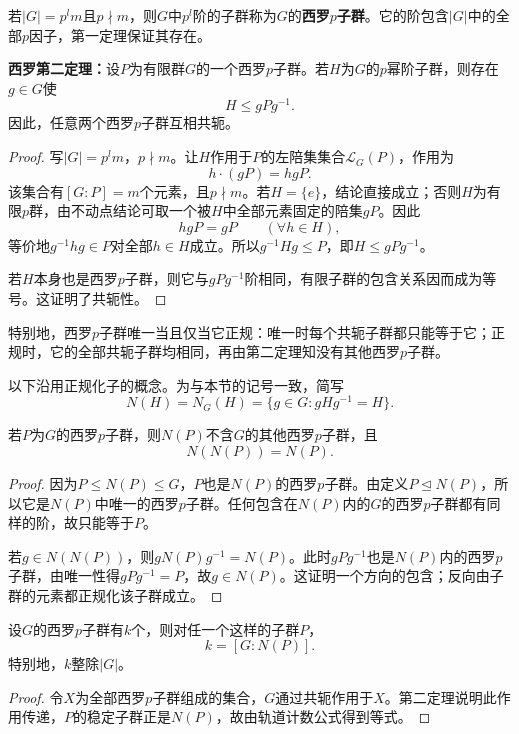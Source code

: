\begin{definition}
若$|G|=p^lm$且$p\nmid m$，则$G$中$p^l$阶的子群称为$G$的\textbf{西罗$p$子群}。它的阶包含$|G|$中的全部$p$因子，第一定理保证其存在。
\end{definition}

\begin{theorem}\label{p2:sylow-two}
\textbf{西罗第二定理：}设$P$为有限群$G$的一个西罗$p$子群。若$H$为$G$的$p$幂阶子群，则存在$g\in G$使
\[
H\leq gPg^{-1}.
\]
因此，任意两个西罗$p$子群互相共轭。
\end{theorem}
\begin{proof}
写$|G|=p^lm$，$p\nmid m$。让$H$作用于$P$的左陪集集合$\mathcal L_G(P)$，作用为
\[
h\cdot(gP)=hgP.
\]
该集合有$[G:P]=m$个元素，且$p\nmid m$。若$H=\{e\}$，结论直接成立；否则$H$为有限$p$群，由不动点结论可取一个被$H$中全部元素固定的陪集$gP$。因此
\[
hgP=gP\qquad(\forall h\in H),
\]
等价地$g^{-1}hg\in P$对全部$h\in H$成立。所以$g^{-1}Hg\leq P$，即$H\leq gPg^{-1}$。

若$H$本身也是西罗$p$子群，则它与$gPg^{-1}$阶相同，有限子群的包含关系因而成为等号。这证明了共轭性。
\end{proof}

特别地，西罗$p$子群唯一当且仅当它正规：唯一时每个共轭子群都只能等于它；正规时，它的全部共轭子群均相同，再由第二定理知没有其他西罗$p$子群。

以下沿用正规化子的概念。为与本节的记号一致，简写
\[
N(H)=N_G(H)=\{g\in G:gHg^{-1}=H\}.
\]

\begin{corollary}\label{p2:sylow-normalizer}
若$P$为$G$的西罗$p$子群，则$N(P)$不含$G$的其他西罗$p$子群，且
\[
N(N(P))=N(P).
\]
\end{corollary}
\begin{proof}
因为$P\leq N(P)\leq G$，$P$也是$N(P)$的西罗$p$子群。由定义$P\trianglelefteq N(P)$，所以它是$N(P)$中唯一的西罗$p$子群。任何包含在$N(P)$内的$G$的西罗$p$子群都有同样的阶，故只能等于$P$。

若$g\in N(N(P))$，则$gN(P)g^{-1}=N(P)$。此时$gPg^{-1}$也是$N(P)$内的西罗$p$子群，由唯一性得$gPg^{-1}=P$，故$g\in N(P)$。这证明一个方向的包含；反向由子群的元素都正规化该子群成立。
\end{proof}

\begin{proposition}
设$G$的西罗$p$子群有$k$个，则对任一个这样的子群$P$，
\[
k=[G:N(P)].
\]
特别地，$k$整除$|G|$。
\end{proposition}
\begin{proof}
令$X$为全部西罗$p$子群组成的集合，$G$通过共轭作用于$X$。第二定理说明此作用传递，$P$的稳定子群正是$N(P)$，故由轨道计数公式得到等式。
\end{proof}


